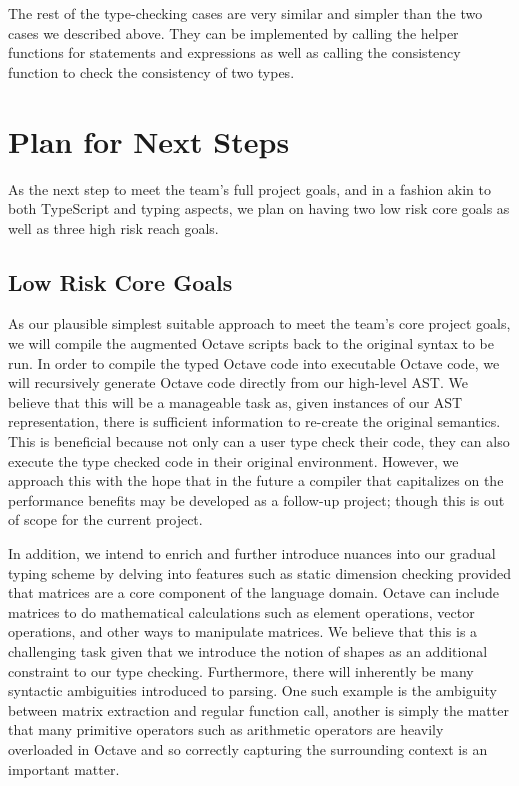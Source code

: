 The rest of the type-checking cases are very similar and simpler than the two cases we described above. They can be implemented by calling the helper functions for statements and expressions as well as calling the consistency function to check the consistency of two types.

\section{Plan for Next Steps}
As the next step to meet the team's full project goals, and in a fashion akin to both TypeScript and typing aspects, we plan on having two low risk core goals as well as three high risk reach goals.

\subsection{Low Risk Core Goals}
As our plausible simplest suitable approach to meet the team's core project goals, we will compile the augmented Octave scripts back to the original syntax to be run. In order to compile the typed Octave code into executable Octave code, we will recursively generate Octave code directly from our high-level AST. We believe that this will be a manageable task as, given instances of our AST representation, there is sufficient information to re-create the original semantics. This is beneficial because not only can a user type check their code, they can also execute the type checked code in their original environment. However, we approach this with the hope that in the future a compiler that capitalizes on the performance benefits may be developed as a follow-up project; though this is out of scope for the current project.

In addition, we intend to enrich and further introduce nuances into our gradual typing scheme by delving into features such as static dimension checking provided that matrices are a core component of the language domain. Octave can include matrices to do mathematical calculations such as element operations, vector operations, and other ways to manipulate matrices. We believe that this is a challenging task given that we introduce the notion of shapes as an additional constraint to our type checking. Furthermore, there will inherently be many syntactic ambiguities introduced to parsing. One such example is the ambiguity between matrix extraction and regular function call, another is simply the matter that many primitive operators such as arithmetic operators are heavily overloaded in Octave and so correctly capturing the surrounding context is an important matter.

